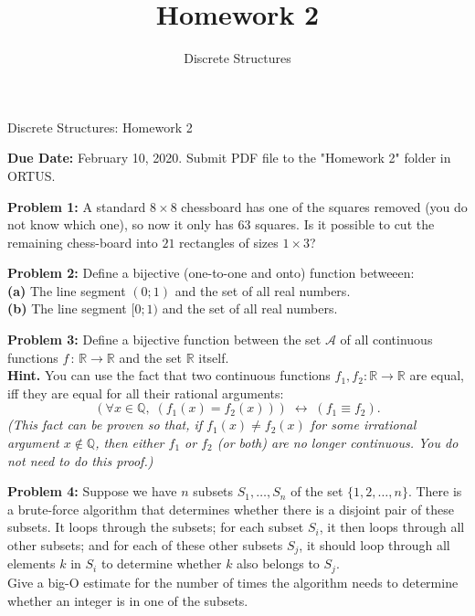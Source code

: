 \documentclass[jou]{apa6}
\title{Homework 2}
\author{Discrete Structures}
\affiliation{RBS}
\begin{document}


\thispagestyle{empty}

\twocolumn
{\Large Discrete Structures: Homework 2}



\noindent
{\bf Due Date:} February 10, 2020. Submit PDF file to the "Homework 2" folder in ORTUS.

\vspace{2ex}
{\bf Problem 1:} A standard $8 \times 8$ chessboard has 
one of the squares removed (you do not know which one), so now it only has $63$ squares. 
Is it possible to cut the remaining chess-board into $21$ rectangles of sizes $1 \times 3$?


\vspace{2ex}
{\bf Problem 2:} Define a bijective (one-to-one and onto) function betweeen:\\
{\bf (a)} The line segment $(0;1)$ and the set of all real numbers. \\
{\bf (b)} The line segment $[0;1)$ and the set of all real numbers.

\vspace{2ex}
{\bf Problem 3:} Define a bijective function between the set $\mathcal{A}$ of all continuous functions
$f \,:\, \mathbb{R} \rightarrow \mathbb{R}$ and 
the set $\mathbb{R}$ itself.\\
{\bf Hint.} You can use the fact that two continuous functions $f_1,f_2:\mathbb{R} \rightarrow \mathbb{R}$ 
are equal, iff they are equal for all their rational arguments: 
$$\left( \forall x \in \mathbb{Q},\;(f_1(x)=f_2(x))\right) \;\leftrightarrow\; (f_1 \equiv f_2).$$
{\em (This fact can be proven so that, if $f_1(x) \neq f_2(x)$ for some irrational 
argument $x \not\in \mathbb{Q}$, then either $f_1$ or $f_2$ (or both) are no longer 
continuous. You do not need to do this proof.)}


\vspace{2ex}
{\bf Problem 4:} Suppose we have $n$ subsets 
$S_1,\ldots,S_n$ of the set $\{1, 2,\ldots, n\}$. 
There is a brute-force algorithm that determines whether there is a disjoint pair of these subsets. It loops 
through the subsets; for each subset $S_i$, 
it then loops through all other subsets; and for each of these other subsets $S_j$, 
it should loop through all elements $k$ in $S_i$ to determine whether $k$ also belongs to $S_j$.\\
Give a big-O estimate for the number of times the algorithm 
needs to determine whether an integer is in one of the subsets.
\end{document}
